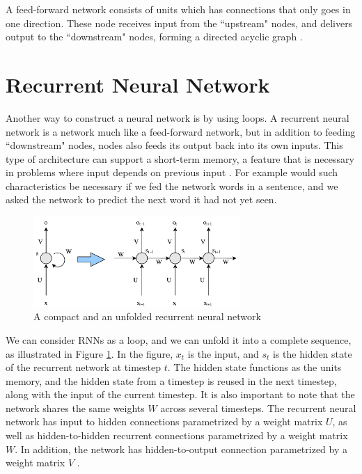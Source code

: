 A feed-forward network consists of units which has connections that only goes in one direction. These node receives input from the ``upstream" nodes, and delivers output to the ``downstream" nodes, forming a directed acyclic graph \citep{russell2010aimodernapproach}.


\section{Recurrent Neural Network}
Another way to construct a neural network is by using loops. A recurrent neural network \citep{rumelhart1988learning} is a network much like a feed-forward network, but in addition to feeding ``downstream" nodes, nodes also feeds its output back into its own inputs. This type of architecture can support a short-term memory, a feature that is necessary in problems where input depends on previous input \citep{russell2010aimodernapproach}. For example would such characteristics be necessary if we fed the network words in a sentence, and we asked the network to predict the next word it had not yet seen.

\begin{figure}[ht]
    \centering
    \includegraphics[width=0.7\textwidth]{fig/related_work/nn_recurrent.pdf}
    \caption{A compact and an unfolded recurrent neural network}
    \label{fig:nn-rnn}
\end{figure}

We can consider RNNs as a loop, and we can unfold it into a complete sequence, as illustrated in Figure \ref{fig:nn-rnn}. In the figure, \(x_{t}\) is the input, and \(s_{t}\) is the hidden state of the recurrent network at timestep \(t\). The hidden state functions as the units memory, and the hidden state from a timestep is reused in the next timestep, along with the input of the current timestep. It is also important to note that the network shares the same weights \(W\) across several timesteps. The recurrent neural network has input to hidden connections parametrized by a weight matrix \(U\), as well as hidden-to-hidden recurrent connections parametrized by a weight matrix \(W\). In addition, the network has hidden-to-output connection parametrized by a weight matrix \(V\) \citep{goodfellow2016deeplearning}.

